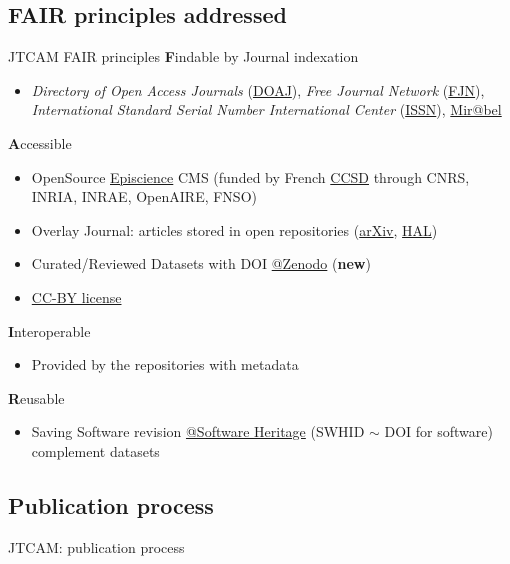 \documentclass[10pt,compress,serif,aspectratio=169]{beamer}
\begin{document}
\subsection{FAIR principles addressed}
\begin{frame}[t]{JTCAM FAIR principles}
  \textbf{F}indable by Journal indexation
  \begin{itemize}
  \item \textit{Directory of Open Access Journals} (\href{https://doaj.org/}{DOAJ}), \textit{Free Journal Network} (\href{https://freejournals.org/}{FJN}), \textit{International Standard Serial Number International Center} (\href{https://www.issn.org/}{ISSN}), \href{https://reseau-mirabel.info/}{Mir@bel}
  \end{itemize}
\vfill
  \textbf{A}ccessible
  \begin{itemize}
  \item OpenSource \href{https://www.episciences.org/}{Episcience} CMS (funded by French \href{https://www.ccsd.cnrs.fr/}{CCSD} through CNRS, INRIA, INRAE, OpenAIRE, FNSO)  
  \item Overlay Journal: articles stored in open repositories (\href{https://arxiv.org/}{arXiv}, \href{https://hal.science/}{HAL})
  \item Curated/Reviewed Datasets with DOI \href{https://zenodo.org/}{@Zenodo} (\textbf{new})
  \item \href{https://creativecommons.org/share-your-work/cclicenses/}{CC-BY license} 
  \end{itemize}
  \vfill
  \textbf{I}nteroperable
  \begin{itemize}
  \item Provided by the repositories with metadata
  \end{itemize}
\vfill
  \textbf{R}eusable
  \begin{itemize}
  \item Saving Software revision \href{https://www.softwareheritage.org/}{@Software Heritage} (SWHID $\sim$ DOI for software) complement datasets  
  \end{itemize}
 
\end{frame}
 

\subsection{Publication process}
\begin{frame}[t]{JTCAM: publication process}
 \begin{center}%
 \end{center}%
\end{frame}
 
\end{document}
